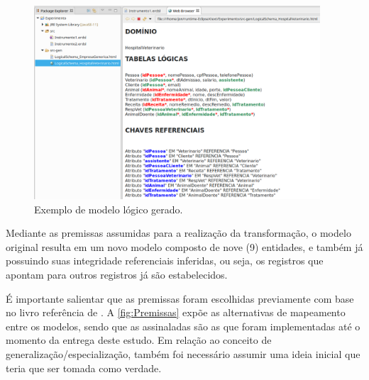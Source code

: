 \begin{figure}[!htb]
    \centering
    \caption{Exemplo de modelo lógico gerado.}
    \label{fig:modeloLogico}
    \includegraphics[width=0.95\textwidth]{img/ModeloLogico}
\end{figure}

Mediante as premissas assumidas para a realização da transformação, o modelo original resulta em um novo modelo composto de nove (9) entidades, e também já possuindo suas integridade referenciais inferidas, ou seja, os registros que apontam para outros registros já são estabelecidos. 

É importante salientar que as premissas foram escolhidas previamente com base no livro referência de .
A \autoref{fig:Premissas} expõe as alternativas de mapeamento entre os modelos, sendo que as assinaladas são as que foram implementadas até o momento da entrega deste estudo.
Em relação ao conceito de generalização/especialização, também foi necessário assumir uma ideia inicial que teria que ser tomada como verdade.


